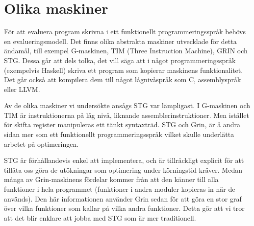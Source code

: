\documentclass[../Core]{subfiles}
\begin{document}


\section{Olika maskiner}
\label{sec:Core:Mask}

För att evaluera program skrivna i ett funktionellt programmeringsspråk
behövs en evalueringsmodell. Det finns olika abstrakta maskiner utvecklade för
detta ändamål, till exempel G-maskinen, TIM (Three Instruction Machine), GRIN \cite{grin} och STG.
Dessa går att dels tolka, det vill säga att i något programmeringsspråk (exempelvis
Haskell) skriva ett program som kopierar maskinens funktionalitet. Det går också att
kompilera dem till något lågnivåspråk som C, assemblyspråk eller LLVM.


Av de olika maskiner vi undersökte ansågs STG var lämpligast. I G-maskinen och TIM  är
instruktionerna på låg nivå, liknande assemblerinstruktioner. Men istället för skifta register manipuleras ett tänkt syntaxträd. STG och Grin, är å andra sidan mer som ett funktionellt
programmeringsspråk vilket skulle underlätta arbetet på optimeringen.

STG är förhållandevis enkel att implementera, och är tillräckligt explicit för att
tillåta oss göra de utökningar som optimering under körningstid kräver.
Medan många av Grin-maskinens fördelar kommer från att den känner till alla funktioner i hela
programmet (funktioner i andra moduler kopieras in när de används). Den här informationen
använder Grin sedan för att göra en stor graf över vilka funktioner som kallar på
vilka andra funktioner. Detta gör att vi tror att det blir enklare att jobba med STG 
som är mer traditionell.
\end{document}
